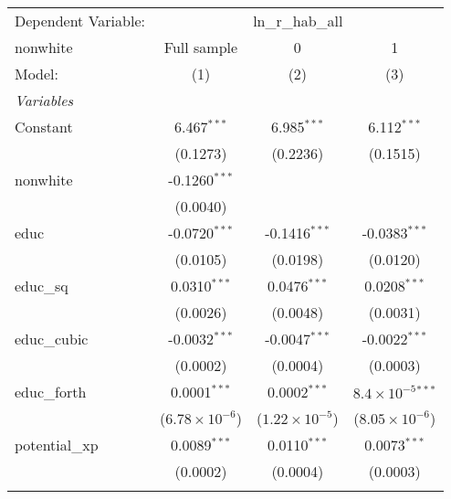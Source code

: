 \begingroup
\centering
\begin{tabular}{lccc}
   \tabularnewline \midrule \midrule
   Dependent Variable: & \multicolumn{3}{c}{ln\_r\_hab\_all}\\
   nonwhite                        & Full sample             & 0                       & 1 \\   
   Model:                          & (1)                     & (2)                     & (3)\\  
   \midrule
   \emph{Variables}\\
   Constant                        & 6.467$^{***}$           & 6.985$^{***}$           & 6.112$^{***}$\\   
                                   & (0.1273)                & (0.2236)                & (0.1515)\\   
   nonwhite                        & -0.1260$^{***}$         &                         &   \\   
                                   & (0.0040)                &                         &   \\   
   educ                            & -0.0720$^{***}$         & -0.1416$^{***}$         & -0.0383$^{***}$\\   
                                   & (0.0105)                & (0.0198)                & (0.0120)\\   
   educ\_sq                        & 0.0310$^{***}$          & 0.0476$^{***}$          & 0.0208$^{***}$\\   
                                   & (0.0026)                & (0.0048)                & (0.0031)\\   
   educ\_cubic                     & -0.0032$^{***}$         & -0.0047$^{***}$         & -0.0022$^{***}$\\   
                                   & (0.0002)                & (0.0004)                & (0.0003)\\   
   educ\_forth                     & 0.0001$^{***}$          & 0.0002$^{***}$          & $8.4\times 10^{-5}$$^{***}$\\    
                                   & ($6.78\times 10^{-6}$)  & ($1.22\times 10^{-5}$)  & ($8.05\times 10^{-6}$)\\    
   potential\_xp                   & 0.0089$^{***}$          & 0.0110$^{***}$          & 0.0073$^{***}$\\   
                                   & (0.0002)                & (0.0004)                & (0.0003)\\   
$$
\end{tabular}
